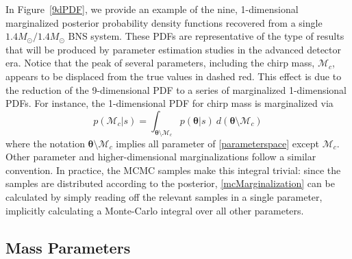 \documentclass[11pt,a4paper]{emulateapj} 
\newcommand{\thpara}{\boldsymbol{\theta}}
\newcommand{\chmass}{\mathcal{M}_c}
\begin{document}
In Figure~\ref{9dPDF}, we provide an example of the nine,
1-dimensional marginalized posterior probability density functions
recovered from a single $1.4M_{\odot}/1.4M_{\odot}$ BNS system.  These
PDFs are representative of the type of results that will be produced by
parameter estimation studies in the advanced detector era.  Notice
that the peak of several parameters, including the chirp mass,
$\chmass$, appears to be displaced from the true values in dashed red.  This
effect is due to the reduction of the 9-dimensional PDF to a series of
marginalized 1-dimensional PDFs.  For instance, the 1-dimensional PDF
for chirp mass is marginalized via
\begin{equation}
p(\chmass | s) = \int _{\thpara \setminus \chmass} p(\thpara |
s)~d(\thpara \setminus \chmass)
\label{mcMarginalization}
\end{equation}
where the notation $\thpara \setminus \chmass$ implies all parameter
of \eqref{parameterspace} except $\chmass$.  Other parameter and
higher-dimensional marginalizations follow a similar convention.  In
practice, the MCMC samples make this integral trivial: since the
samples are distributed according to the posterior,
\eqref{mcMarginalization} can be calculated by simply reading off the
relevant samples in a single parameter, implicitly calculating a
Monte-Carlo integral over all other parameters.



\subsection{Mass Parameters}
\label{massSection}
\end{document}
